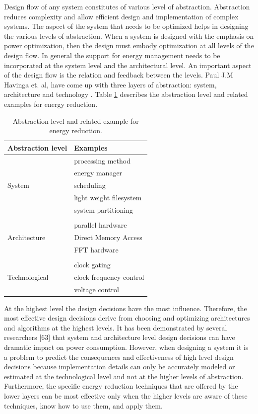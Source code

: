 Design flow of any system constitutes of various level of abstraction. Abstraction reduces complexity and allow efficient design and implementation of complex systems. The aspect of the system that needs to be optimized helps in designing the various levels of abstraction. When a system is designed with the emphasis on power optimization, then the design must embody optimization at all levels of the design flow. In general the support for energy management needs to be incorporated at the system level and the architectural level. An important aspect of the design flow is the relation and feedback between the levels. Paul J.M Havinga et. al, have come up with three layers of abstraction: system, architecture and technology \cite{havinga, havinga2, havinga3}. Table \ref{table:abstraction} describes the abstraction level and related examples for energy reduction.
 \begin{table}
 	\centering
 	\begin{tabular}{|l|l|}
 		\hline
 		Abstraction level & Examples  \\
 		\hline
 		  & processing method \\
 		  & energy manager \\
 		  System & scheduling \\
 		  & light weight filesystem \\
 		  & system partitioning \\
 		  & \\
 		  & parallel hardware \\
 		  Architecture & Direct Memory Access \\
 		  & FFT hardware \\
 		  &  \\
 		  & clock gating \\
 		  Technological & clock frequency control \\
 		  & voltage control \\
 		\hline
 	\end{tabular}
 	\caption{Abstraction level and related example for energy reduction.}
 	\label{table:abstraction}
 \end{table}


\hspace{10mm}At the highest level the design decisions have the most influence. Therefore, the most effective design decisions derive from choosing and optimizing 
 architectures and algorithms at the highest levels. It has been demonstrated by several researchers [63] that system and architecture level design decisions can have dramatic impact on power consumption. However, when designing a system it is a problem to predict the consequences and effectiveness of high level design decisions because implementation details can only be accurately modeled or estimated at the technological 
 level and not at the higher levels of abstraction. Furthermore, the specific energy reduction techniques that are offered by the lower layers can be most effective only when the higher levels are aware of these techniques, know how to use them, and apply them.
 

